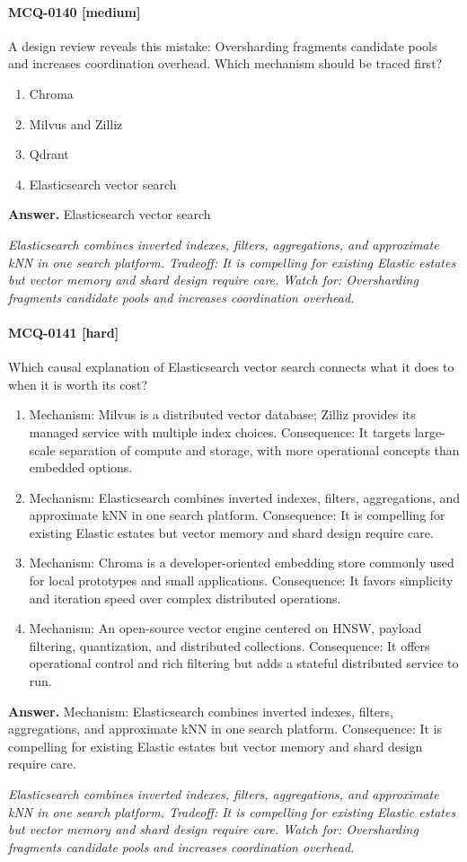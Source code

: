\paragraph{MCQ-0140 [medium]} A design review reveals this mistake: Oversharding fragments candidate pools and increases coordination overhead. Which mechanism should be traced first?
\begin{enumerate}[label=\Alph*.]
\item Chroma
\item Milvus and Zilliz
\item Qdrant
\item Elasticsearch vector search
\end{enumerate}
\noindent\textbf{Answer.} Elasticsearch vector search
\par\textit{Elasticsearch combines inverted indexes, filters, aggregations, and approximate kNN in one search platform. Tradeoff: It is compelling for existing Elastic estates but vector memory and shard design require care. Watch for: Oversharding fragments candidate pools and increases coordination overhead.}
\paragraph{MCQ-0141 [hard]} Which causal explanation of Elasticsearch vector search connects what it does to when it is worth its cost?
\begin{enumerate}[label=\Alph*.]
\item Mechanism: Milvus is a distributed vector database; Zilliz provides its managed service with multiple index choices. Consequence: It targets large-scale separation of compute and storage, with more operational concepts than embedded options.
\item Mechanism: Elasticsearch combines inverted indexes, filters, aggregations, and approximate kNN in one search platform. Consequence: It is compelling for existing Elastic estates but vector memory and shard design require care.
\item Mechanism: Chroma is a developer-oriented embedding store commonly used for local prototypes and small applications. Consequence: It favors simplicity and iteration speed over complex distributed operations.
\item Mechanism: An open-source vector engine centered on HNSW, payload filtering, quantization, and distributed collections. Consequence: It offers operational control and rich filtering but adds a stateful distributed service to run.
\end{enumerate}
\noindent\textbf{Answer.} Mechanism: Elasticsearch combines inverted indexes, filters, aggregations, and approximate kNN in one search platform. Consequence: It is compelling for existing Elastic estates but vector memory and shard design require care.
\par\textit{Elasticsearch combines inverted indexes, filters, aggregations, and approximate kNN in one search platform. Tradeoff: It is compelling for existing Elastic estates but vector memory and shard design require care. Watch for: Oversharding fragments candidate pools and increases coordination overhead.}
